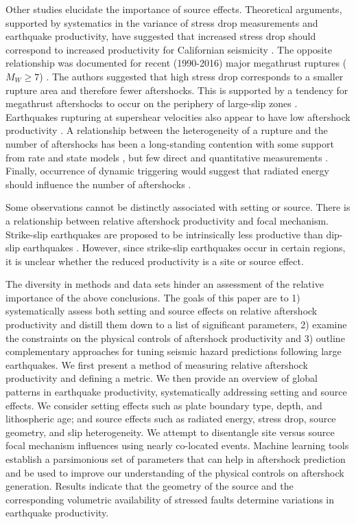 \documentclass[draft]{agujournal2018}
\begin{document}
Other studies elucidate the importance of source effects. Theoretical arguments, supported by systematics in the variance of stress drop measurements and earthquake productivity, have suggested that increased stress drop should correspond to increased productivity for Californian seismicity \citep{Marsan2017HowAftershocks}. The opposite relationship was documented for recent (1990-2016) major megathrust ruptures ($M_W \ge 7$) \citep{Wetzler2016}. The authors suggested that high stress drop corresponds to a smaller rupture area and therefore fewer aftershocks. This is supported by a tendency for megathrust aftershocks to occur on the periphery of large-slip zones \citep{Wetzler2016}. Earthquakes rupturing at supershear velocities also appear to have low aftershock productivity \citep{Bouchon2008TheEarthquakes}. A relationship between the heterogeneity of a rupture and the number of aftershocks has been a long-standing contention \citep{Mogi1967, Yamanaka1990scalingshock} with some support from rate and state models \citep{Helmstetter2006RelationModel, Marsan2006}, but few direct and quantitative measurements \citep{Das2003SpatialDistribution, Houston2004}. Finally, occurrence of dynamic triggering would suggest that radiated energy should influence the number of aftershocks \citep{felzer2006decay}.  

Some observations cannot be distinctly associated with setting or source. There is a relationship between relative aftershock productivity and focal mechanism. Strike-slip earthquakes are proposed to be intrinsically less productive than dip-slip earthquakes \citep{Tahir2012, Tahir2014Aftershock2005, Tahir2015}. However, since strike-slip earthquakes occur in certain regions, it is unclear whether the reduced productivity is a site or source effect.

The diversity in methods and data sets hinder an assessment of the relative importance of the above conclusions. The goals of this paper are to 1) systematically assess both setting and source effects on relative aftershock productivity and distill them down to a list of significant parameters, 2) examine the constraints on the physical controls of aftershock productivity and 3) outline complementary approaches for tuning seismic hazard predictions following large earthquakes. We first present a method of measuring relative aftershock productivity and defining a metric. We then provide an overview of global patterns in earthquake productivity, systematically addressing setting and source effects. We consider setting effects such as plate boundary type, depth, and lithospheric age; and source effects such as radiated energy, stress drop, source geometry, and slip heterogeneity. We attempt to disentangle site versus source focal mechanism influences using nearly co-located events. Machine learning tools establish a parsimonious set of parameters that can help in aftershock prediction and be used to improve our understanding of the physical controls on aftershock generation. Results indicate that the geometry of the source and the corresponding volumetric availability of stressed faults determine variations in earthquake productivity.
\end{document}
